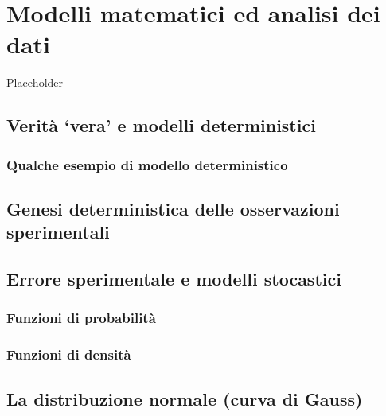 \documentclass[a4paper,12pt,oneside]{book}
\begin{document}
\hypertarget{modelli-matematici-ed-analisi-dei-dati}{%
\chapter{Modelli matematici ed analisi dei dati}\label{modelli-matematici-ed-analisi-dei-dati}}

Placeholder

\hypertarget{verita-vera-e-modelli-deterministici}{%
\section{Verità `vera' e modelli deterministici}\label{verita-vera-e-modelli-deterministici}}

\hypertarget{qualche-esempio-di-modello-deterministico}{%
\subsection{Qualche esempio di modello deterministico}\label{qualche-esempio-di-modello-deterministico}}

\hypertarget{genesi-deterministica-delle-osservazioni-sperimentali}{%
\section{Genesi deterministica delle osservazioni sperimentali}\label{genesi-deterministica-delle-osservazioni-sperimentali}}

\hypertarget{errore-sperimentale-e-modelli-stocastici}{%
\section{Errore sperimentale e modelli stocastici}\label{errore-sperimentale-e-modelli-stocastici}}

\hypertarget{funzioni-di-probabilita}{%
\subsection{Funzioni di probabilità}\label{funzioni-di-probabilita}}

\hypertarget{funzioni-di-densita}{%
\subsection{Funzioni di densità}\label{funzioni-di-densita}}

\hypertarget{la-distribuzione-normale-curva-di-gauss}{%
\section{La distribuzione normale (curva di Gauss)}\label{la-distribuzione-normale-curva-di-gauss}}
\end{document}
